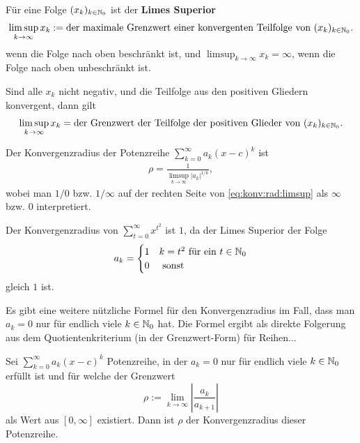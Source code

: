 \begin{defn} 
	Für eine Folge $(x_k)_{k \in \mathbb{N}_0}$ ist der \textbf{Limes Superior}
	\[
		\limsup_{k \to \infty} x_k := \text{der maximale Grenzwert einer konvergenten Teilfolge von} \ (x_k)_{k \in \mathbb{N}_0}.
	\]
	wenn die Folge nach oben beschränkt ist, und
	$\limsup_{k \to \infty} x_k = \infty$, wenn die Folge nach oben unbeschränkt ist. 
\end{defn}

\begin{bem}
	Sind alle $x_k$ nicht negativ, und die Teilfolge aus den positiven Gliedern konvergent, dann gilt 
	\[
		\limsup_{k \to \infty} x_k = \text{der Grenzwert der Teilfolge der positiven Glieder von} \ (x_k)_{k \in \mathbb{N}_0}.  
	\]
\end{bem} 

\begin{thm}[Update]
	Der Konvergenzradius der Potenzreihe $\sum_{k=0}^\infty a_k (x-c)^k$ ist
	\begin{align}
		\label{eq:konv:rad:limsup}
	\rho = \frac{1}{ \limsup_{k \to \infty} |a_k|^{1/k}},
	\end{align}
	wobei man $1/0$ bzw. $1/\infty$ auf der rechten Seite von \eqref{eq:konv:rad:limsup} als $\infty$ bzw. $0$ interpretiert. 
\end{thm} 

\begin{bsp} 
	Der Konvergenzradius von $\sum_{t=0}^\infty x^{t^2}$ ist $1$, da der Limes Superior der Folge 
	\[
		a_k = \begin{cases}
			1 & k=t^2  \ \text{für ein $t \in \mathbb{N}_0$}
			\\ 0 & \ \text{sonst}
		\end{cases} 
	\]
	gleich $1$ ist. 
\end{bsp} 

\begin{bem}
	Es gibt eine weitere nützliche Formel für den Konvergenzradius im Fall, dass man $a_k=0$ nur für endlich viele $k \in \mathbb{N}_0$ hat. Die Formel ergibt als direkte Folgerung aus dem Quotientenkriterium (in der Grenzwert-Form) für Reihen...
\end{bem} 

\begin{thm} 
	Sei $\sum_{k=0}^\infty a_k (x-c)^k$ Potenzreihe, in der $a_k=0$ nur für endlich viele $k \in \mathbb{N}_0$ erfüllt ist und für welche der Grenzwert 
	\[
		\rho:=\lim_{k \to \infty} \left| \frac{a_k}{a_{k+1}} \right| 
	\] als Wert aus $[0,\infty]$ existiert. Dann ist  $\rho$ der Konvergenzradius dieser Potenzreihe. 
\end{thm} 

